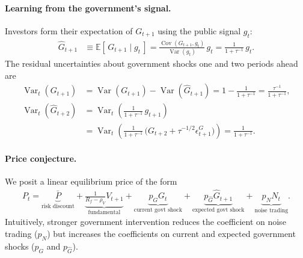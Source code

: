 \documentclass[12pt]{article}
\begin{document}
\paragraph{Learning from the government's signal.}
Investors form their expectation of \(G_{t+1}\) using the public signal \(g_t\):
\begin{align*}
    \hat{G}_{t+1} &\equiv \mathbb{E}[\,G_{t+1} \mid g_t\,] 
                  = \frac{\operatorname{Cov}(G_{t+1}, g_t)}{\operatorname{Var}(g_t)} \, g_t 
                  = \frac{1}{1 + \tau^{-1}} \, g_t .
\end{align*}
The residual uncertainties about government shocks one and two periods ahead are
\begin{align*}
    \operatorname{Var}_t(G_{t+1}) 
        &= \operatorname{Var}(G_{t+1}) - \operatorname{Var}(\hat{G}_{t+1}) 
          = 1 - \frac{1}{1+\tau^{-1}} 
          = \frac{\tau^{-1}}{1+\tau^{-1}},\\[4pt]
    \operatorname{Var}_t(\hat{G}_{t+2}) 
        &= \operatorname{Var}_t\!\left(\frac{1}{1+\tau^{-1}} \, g_{t+1}\right) \\
        &= \operatorname{Var}_t\!\left(
              \frac{1}{1+\tau^{-1}} \,
              \bigl(G_{t+2} + \tau^{-1/2} \epsilon_{t+1}^G\bigr)
           \right) 
          = \frac{1}{1+\tau^{-1}} .
\end{align*}

\paragraph{Price conjecture.}
We posit a linear equilibrium price of the form
\begin{align}
    P_t = \underbrace{\bar{P}}_{\text{risk discount}} 
          + \underbrace{\frac{1}{R_f - \rho_V} V_{t+1}}_{\text{fundamental}} 
          + \underbrace{p_G G_t}_{\text{current govt shock}} 
          + \underbrace{p_{\hat{G}} \hat{G}_{t+1}}_{\text{expected govt shock}} 
          + \underbrace{p_N N_t}_{\text{noise trading}}. \label{price_conjecture}
\end{align}
Intuitively, stronger government intervention reduces the coefficient on noise trading (\(p_N\)) but increases the coefficients on current and expected government shocks (\(p_G\) and \(p_{\hat{G}}\)). 
\end{document}
